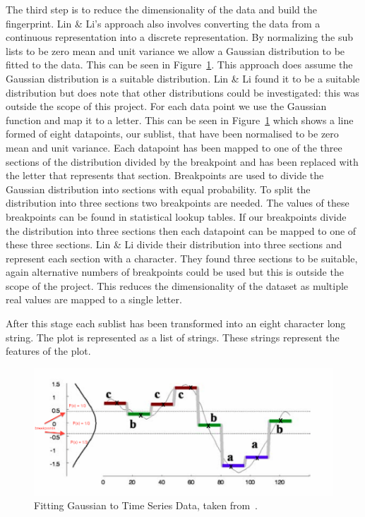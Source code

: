 The third step is to reduce the dimensionality of the data and build the fingerprint.  Lin \& Li's approach also involves converting the data from a continuous representation into a discrete representation.  By normalizing the sub lists to be zero mean and unit variance we allow a Gaussian distribution to be fitted to the data.  This can be seen in Figure~\ref{fig:gaussian_plot}.  This approach does assume the Gaussian distribution is a suitable distribution.  Lin \& Li found it to be a suitable distribution but does note that other distributions could be investigated: this was outside the scope of this project.  For each data point we use the Gaussian function and map it to a letter.  This can be seen in Figure~\ref{fig:gaussian_plot} which shows a line formed of eight datapoints, our sublist, that have been normalised to be zero mean and unit variance.  Each datapoint has been mapped to one of the three sections of the distribution divided by the breakpoint and has been replaced with the letter that represents that section.  Breakpoints are used to divide the Gaussian distribution into sections with equal probability.  To split the distribution into three sections two breakpoints are needed. The values of these breakpoints can be found in statistical lookup tables.  If our breakpoints divide the distribution into three sections then each datapoint can be mapped to one of these three sections.  Lin \& Li divide their distribution into three sections and represent each section with a character.  They found three sections to be suitable, again alternative numbers of breakpoints could be used but this is outside the scope of the project.  This reduces the dimensionality of the dataset as multiple real values are mapped to a single letter.

After this stage each sublist has been transformed into an eight character long string.  The plot is represented as a list of strings.  These strings represent the features of the plot.

\begin{figure}[h!]
    \centering
    \includegraphics[width=\textwidth]{images/similiarty_normalise.png}
    \caption{Fitting Gaussian to Time Series Data, taken from~\cite{structural_similarity}.}
    \label{fig:gaussian_plot}
\end{figure}

